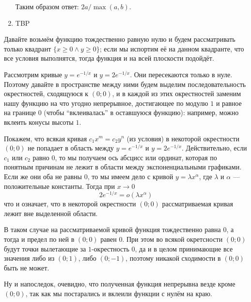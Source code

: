 \documentclass[12pt,a4paper]{article}
\begin{document}
\begin{enumproblem}
\begin{enumerate}
                Таким образом ответ: $2a/\max(a, b)$.
            
            \item TBP
        \end{enumerate}
    \end{enumproblem}

    \begin{enumproblem}
        Давайте возьмём функцию тождественно равную нулю и будем рассматривать только квадрант $\{x \geqslant 0 \wedge y \geqslant 0\}$; если мы испортим её на данном квадранте, что все условия выполнятся, тогда функция и на всей плоскости подойдёт.

        Рассмотрим кривые $y = e^{-1/x}$ и $y = 2e^{-1/x}$. Они пересекаются только в нуле. Поэтому давайте в пространстве между ними будем выделим последовательность окрестностей, сходящуюся к $(0; 0)$, и в каждой из этих окрестностей заменим нашу функцию на что угодно непрерывное, достигающее по модулю $1$ и равное на границе $0$ (чтобы ``вклеивалась'' в оставшуюся функцию): например, можно вклеить конусы высоты $1$.
        
        Покажем, что всякая кривая $c_1 x^m = c_2 y^n$ (из условия) в некоторой окрестности $(0; 0)$ не попадает в область между $y = e^{-1/x}$ и $y = 2e^{-1/x}$. Действительно, если $c_1$ или $c_2$ равно $0$, то мы получаем ось абсцисс или ординат, которая по понятным причинам не лежит в области между экспоненциальными графиками. Если же они оба не равны $0$, то мы имеем дело с кривой $y = \lambda x^\alpha$, где $\lambda$ и $\alpha$ --- положительные константы. Тогда при $x \to 0$
        \[2 e^{-1/x} = o(\lambda x^\alpha)\]
        что и означает, что в некоторой окрестности $(0; 0)$ рассматриваемая кривая лежит вне выделенной области.

        В таком случае на рассматриваемой кривой функция тождественно равна $0$, а тогда и предел по ней в $(0; 0)$ равен $0$. При этом во всякой окретсности $(0; 0)$ будут точки вылетающие за $1$-окрестность $0$, да и в целом принимающие все значения либо из $(0; 1)$, либо $(0; -1)$, поэтому никакой сходимости в $(0; 0)$ быть не может.

        Ну и напоследок, очевидно, что полученная функция непрерывна везде кроме $(0; 0)$, так как мы постарались и вклеили функции с нулём на краю.
    \end{enumproblem}
\end{document}
